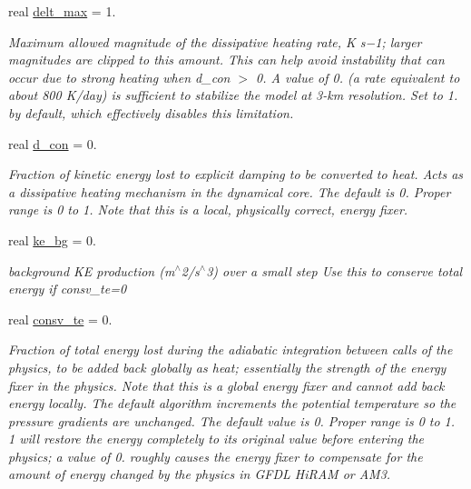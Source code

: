 \begin{DoxyCompactItemize}
real \hyperlink{structfv__arrays__mod_1_1fv__flags__type_a33f224dad417bcc25d11e2fdce4f2a53}{delt\-\_\-max} = 1.
\begin{DoxyCompactList}\small\item\em Maximum allowed magnitude of the dissipative heating rate, K s−1; larger magnitudes are clipped to this amount. This can help avoid instability that can occur due to strong heating when d\-\_\-con $>$ 0. A value of 0. (a rate equivalent to about 800 K/day) is sufficient to stabilize the model at 3-\/km resolution. Set to 1. by default, which effectively disables this limitation. \end{DoxyCompactList}\item 
real \hyperlink{structfv__arrays__mod_1_1fv__flags__type_a548bc4f07258aa2cbf20fbcace2c52f8}{d\-\_\-con} = 0.
\begin{DoxyCompactList}\small\item\em Fraction of kinetic energy lost to explicit damping to be converted to heat. Acts as a dissipative heating mechanism in the dynamical core. The default is 0. Proper range is 0 to 1. Note that this is a local, physically correct, energy fixer. \end{DoxyCompactList}\item 
real \hyperlink{structfv__arrays__mod_1_1fv__flags__type_a166399db4aa8c0330f95f0f7df26cc13}{ke\-\_\-bg} = 0.
\begin{DoxyCompactList}\small\item\em background K\-E production (m$^\wedge$2/s$^\wedge$3) over a small step Use this to conserve total energy if consv\-\_\-te=0 \end{DoxyCompactList}\item 
real \hyperlink{structfv__arrays__mod_1_1fv__flags__type_a0636d8677b28dfabffa981e838f08ebc}{consv\-\_\-te} = 0.
\begin{DoxyCompactList}\small\item\em Fraction of total energy lost during the adiabatic integration between calls of the physics, to be added back globally as heat; essentially the strength of the energy fixer in the physics. Note that this is a global energy fixer and cannot add back energy locally. The default algorithm increments the potential temperature so the pressure gradients are unchanged. The default value is 0. Proper range is 0 to 1. 1 will restore the energy completely to its original value before entering the physics; a value of 0. roughly causes the energy fixer to compensate for the amount of energy changed by the physics in G\-F\-D\-L Hi\-R\-A\-M or A\-M3. \end{DoxyCompactList}\item 

\end{DoxyCompactItemize}
